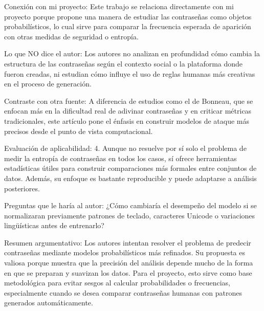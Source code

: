 \documentclass[12pt, letterpaper]{article}
\begin{document}
\noindent
Conexión con mi proyecto: Este trabajo se relaciona directamente con mi proyecto porque propone una manera de estudiar las contraseñas como objetos probabilísticos, lo cual sirve para comparar la frecuencia esperada de aparición con otras medidas de seguridad o entropía.\newline

\noindent
Lo que NO dice el autor: Los autores no analizan en profundidad cómo cambia la estructura de las contraseñas según el contexto social o la plataforma donde fueron creadas, ni estudian cómo influye el uso de reglas humanas más creativas en el proceso de generación. \newline

\noindent
Contraste con otra fuente: A diferencia de estudios como el de Bonneau, que se enfocan más en la dificultad real de adivinar contraseñas y en criticar métricas tradicionales, este artículo pone el énfasis en construir modelos de ataque más precisos desde el punto de vista computacional.   \newline 

\noindent
Evaluación de aplicabilidad: 4. Aunque no resuelve por sí solo el problema de medir la entropía de contraseñas en todos los casos, sí ofrece herramientas estadísticas útiles para construir comparaciones más formales entre conjuntos de datos. Además, su enfoque es bastante reproducible y puede adaptarse a análisis posteriores. \newline

\noindent
Preguntas que le haría al autor: ¿Cómo cambiaría el desempeño del modelo si se normalizaran previamente patrones de teclado, caracteres Unicode o variaciones lingüísticas antes de entrenarlo? \newline

\noindent
Resumen argumentativo: Los autores intentan resolver el problema de predecir contraseñas mediante modelos probabilísticos más refinados. Su propuesta es valiosa porque muestra que la precisión del análisis depende mucho de la forma en que se preparan y suavizan los datos. Para el proyecto, esto sirve como base metodológica para evitar sesgos al calcular probabilidades o frecuencias, especialmente cuando se desea comparar contraseñas humanas con patrones generados automáticamente.
\end{document}
